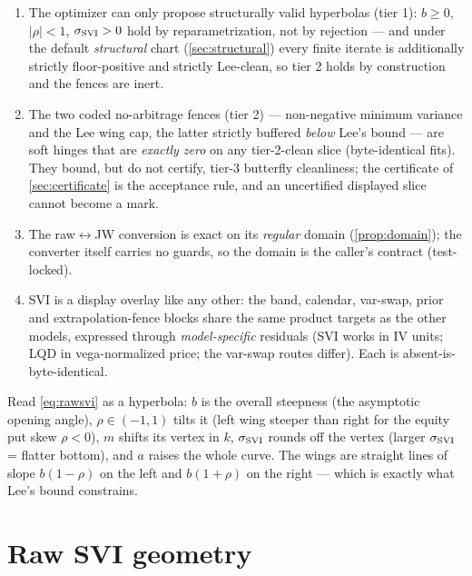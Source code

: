 \documentclass[11pt]{article}
\begin{document}
\begin{invariant}
\begin{enumerate}[leftmargin=1.6em]
\item The optimizer can only propose structurally valid hyperbolas (tier 1):
$b\ge0$, $|\rho|<1$, $\sigma_{\mathrm{SVI}}>0$ hold by reparametrization, not by rejection
--- and under the default \emph{structural} chart (\cref{sec:structural})
every finite iterate is additionally strictly floor-positive and strictly
Lee-clean, so tier 2 holds by construction and the fences are inert.
\item The two coded no-arbitrage fences (tier 2) --- non-negative minimum
variance and the Lee wing cap, the latter strictly buffered \emph{below}
Lee's bound --- are soft hinges that are \emph{exactly zero} on any
tier-2-clean slice (byte-identical fits). They bound, but do not certify,
tier-3 butterfly cleanliness; the certificate of \cref{sec:certificate} is
the acceptance rule, and an uncertified displayed slice cannot become a
mark.
\item The raw$\leftrightarrow$JW conversion is exact on its \emph{regular}
domain (\cref{prop:domain}); the converter itself carries no guards, so the
domain is the caller's contract (test-locked).
\item SVI is a display overlay like any other: the band, calendar, var-swap,
prior and extrapolation-fence blocks share the same product targets as the
other models, expressed through \emph{model-specific} residuals (SVI works in
IV units; LQD in vega-normalized price; the var-swap routes differ). Each is
absent-is-byte-identical.
\end{enumerate}
\end{invariant}

\begin{heuristic}
Read \eqref{eq:rawsvi} as a hyperbola: $b$ is the overall steepness (the
asymptotic opening angle), $\rho\in(-1,1)$ tilts it (left wing steeper than right
for the equity put skew $\rho<0$), $m$ shifts its vertex in $k$, $\sigma_{\mathrm{SVI}}$ rounds
off the vertex (larger $\sigma_{\mathrm{SVI}}$ = flatter bottom), and $a$ raises the whole curve.
The wings are straight lines of slope $b(1-\rho)$ on the left and $b(1+\rho)$ on
the right --- which is exactly what Lee's bound constrains.
\end{heuristic}

\section{Raw SVI geometry}
\label{sec:raw}
\end{document}
